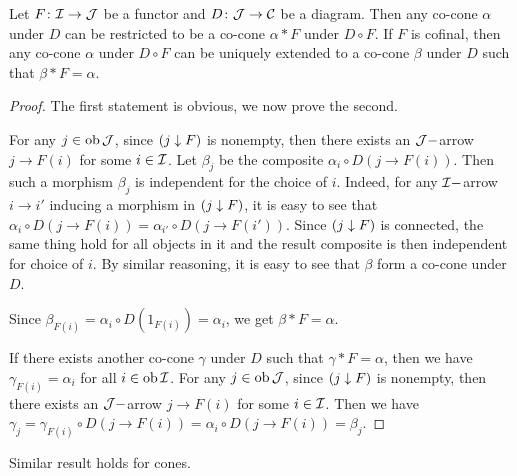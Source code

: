 \begin{lem}\label{lem:restrict diagram}
  Let $F\colon{\cal I}\to{\cal J}$ be a functor and $D\colon{\cal J}\to{\cal C}$ be a diagram. Then any co-cone $\alpha$ under $D$ can be restricted to be a co-cone $\alpha\ast F$ under $D\circ F$. If $F$ is cofinal, then any co-cone $\alpha$ under $D\circ F$ can be uniquely extended to a co-cone $\beta$ under $D$ such that $\beta\ast F=\alpha$.
\end{lem}
\begin{proof}
  The first statement is obvious, we now prove the second.

  For any $j\in\operatorname{ob}{\cal J}$, since $(j\downarrow F)$ is nonempty, then there exists an ${\cal J}-$arrow $j\to F(i)$ for some $i\in{\cal I}$. Let $\beta_j$ be the composite $\alpha_i\circ D(j\to F(i))$. Then such a morphism $\beta_j$ is independent for the choice of $i$. Indeed, for any ${\cal I}-$arrow $i\to i'$ inducing a morphism in $(j\downarrow F)$, it is easy to see that $\alpha_i\circ D(j\to F(i)) = \alpha_{i'}\circ D(j\to F(i'))$. Since $(j\downarrow F)$ is connected, the same thing hold for all objects in it and the result composite is then independent for choice of $i$.
  By similar reasoning, it is easy to see that $\beta$ form a co-cone under $D$.

  Since $\beta_{F(i)} = \alpha_i\circ D(1_{F(i)}) = \alpha_i$, we get $\beta\ast F=\alpha$.

  If there exists another co-cone $\gamma$ under $D$ such that $\gamma\ast F=\alpha$, then we have $\gamma_{F(i)}=\alpha_i$ for all $i\in\operatorname{ob}{\cal I}$. For any $j\in\operatorname{ob}{\cal J}$, since $(j\downarrow F)$ is nonempty, then there exists an ${\cal J}-$arrow $j\to F(i)$ for some $i\in{\cal I}$. Then we have $\gamma_j = \gamma_{F(i)}\circ D(j\to F(i)) = \alpha_i\circ D(j\to F(i)) =\beta_j$.
\end{proof}
\begin{rem}
  Similar result holds for cones.
\end{rem}

